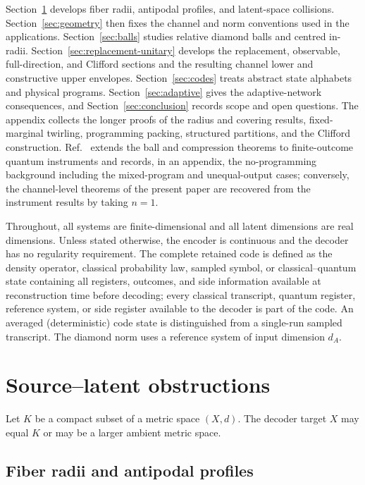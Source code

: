 \documentclass[11pt,a4paper]{article}
\theoremstyle{definition}
\theoremstyle{plain}
\theoremstyle{remark}
\begin{document}
Section~\ref{sec:source-latent} develops fiber radii, antipodal profiles, and
latent-space collisions. Section~\ref{sec:geometry} then fixes the channel
and norm conventions used in the applications. Section~\ref{sec:balls}
studies relative diamond balls and centred in-radii.
Section~\ref{sec:replacement-unitary} develops the replacement, observable,
full-direction, and Clifford sections and the resulting channel lower and constructive upper envelopes. Section~\ref{sec:codes}
treats abstract state alphabets and physical programs.
Section~\ref{sec:adaptive} gives the adaptive-network consequences, and
Section~\ref{sec:conclusion} records scope and open questions. The appendix
collects the longer proofs of the radius and covering results, fixed-marginal
twirling, programming packing, structured partitions, and the Clifford
construction. Ref.~\cite{CompanionInstruments} extends the ball and compression theorems to finite-outcome quantum instruments and records, in an appendix, the no-programming background including the mixed-program and unequal-output cases; conversely, the channel-level theorems of the present paper are recovered from the instrument results by taking $n=1$.

Throughout, all systems are finite-dimensional and all latent dimensions are
real dimensions. Unless stated otherwise, the encoder is continuous and the
decoder has no regularity requirement. The complete retained code is defined as the density operator, classical probability law, sampled symbol, or
classical--quantum state containing all registers, outcomes, and side
information available at reconstruction time before decoding; every classical transcript, quantum register, reference system, or side register available to the decoder is part of the code. An averaged (deterministic) code state is distinguished from a single-run sampled transcript. The diamond norm uses a
reference system of input dimension $d_A$.

\section{Source--latent obstructions}
\label{sec:source-latent}

Let $K$ be a compact subset of a metric space $(X,d)$. The decoder target
$X$ may equal $K$ or may be a larger ambient metric space.

\subsection{Fiber radii and antipodal profiles}
\end{document}
